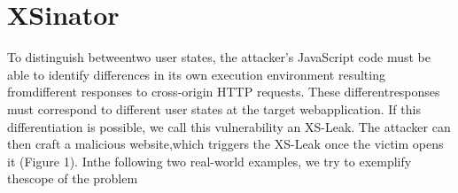 \section{XSinator}

To distinguish betweentwo user states, the attacker’s JavaScript code must be able to identify differences in its own execution environment resulting fromdifferent responses to cross-origin HTTP requests. These differentresponses must correspond to different user states at the target webapplication. If this differentiation is possible, we call this vulnerability an XS-Leak. The attacker can then craft a malicious website,which triggers the XS-Leak once the victim opens it (Figure 1). Inthe following two real-world examples, we try to exemplify thescope of the problem